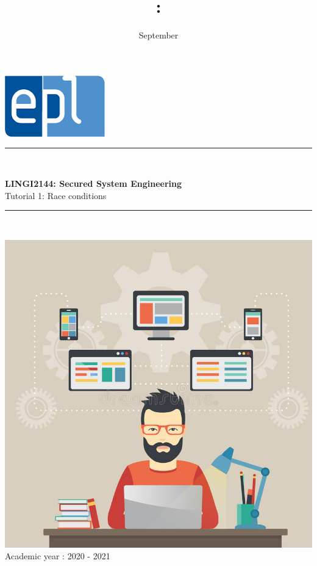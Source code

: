 \documentclass{article}
\title{\codecourse : \titlecourse}
\author{\othor}
\date{September \year}
\newcommand{\codecourse}{LINGI2144}
\newcommand{\titlecourse}{Secured System Engineering}
\newcommand{\ayear}{2020 - 2021}
\begin{document}
        \hfill\includegraphics[scale=0.5]{image/logoepl.png}
        
        \vspace*{\fill}
            
        \begin{center}
        
            \rule{1\textwidth}{1pt}\\
	            \vspace{0.5\baselineskip}
		            \begin{LARGE}
	                	\textbf{\codecourse : \titlecourse}\\
	                	Tutorial 1: Race conditions
		            \end{LARGE}
		        \vspace{0.5\baselineskip}       
	        \rule{1\textwidth}{1pt}\\
	        
	        \vspace{0.5\baselineskip}
	        
	        \includegraphics[scale=1.5]{image/MCP.jpg}\\

	        \vspace{0.5\baselineskip}
	            Academic year : \ayear\\
                
		\end{center}
		
\end{document}

